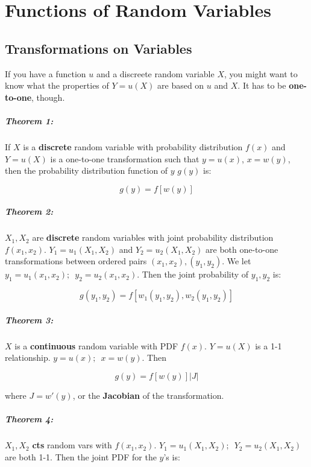 \documentclass[a4paper,12pt]{report}
\begin{document}
\chapter{Functions of Random Variables}

\section{Transformations on Variables}

If you have a function $u$ and a discreete random variable $X$, you might want to know what the properties of $Y = u(X)$ are based on $u$ and $X$. It has to be \textbf{one-to-one}, though.

\paragraph{Theorem 1: } If $X$ is a \textbf{discrete} random variable with probability distribution $f(x)$ and $Y = u(X)$ is a one-to-one transformation such that $y = u(x)$, $x = w(y)$, then the 
probability distribution function of $y$ $g(y)$ is: 

$$g(y) = f[w(y)]$$


\paragraph{Theorem 2: } $X_1, X_2$ are \textbf{discrete} random variables with joint probability distribution $f(x_1, x_2)$. $Y_1 = u_1(X_1, X_2)$ and $Y_2 = u_2(X_1, X_2)$ are both one-to-one transformations between ordered pairs $(x_1, x_2), (y_1, y_2)$. We let $y_1 = u_1(x_1, x_2);\,\,\, y_2 = u_2(x_1, x_2)$. Then the joint probability of $y_1, y_2$ is: 

$$g(y_1, y_2) = f[w_1(y_1, y_2), w_2(y_1, y_2)]$$

\paragraph{Theorem 3: } $X$ is a \textbf{continuous} random variable with PDF $f(x)$. $Y = u(X)$ is a 1-1 relationship. $y = u(x);\,\,\, x = w(y)$. Then 

$$g(y) = f[w(y)] | J|$$

where $J = w'(y)$, or the \textbf{Jacobian} of the transformation.

\paragraph{Theorem 4: } $X_1, X_2$ \textbf{cts} random vars with $f(x_1, x_2)$. $Y_1 = u_1(X_1, X_2);\,\,\, Y_2 = u_2(X_1, X_2)$ are both 1-1. Then the joint PDF for the $y$'s is: 
\end{document}
